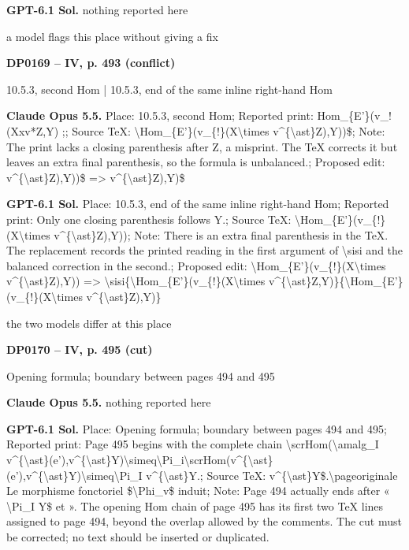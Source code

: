 \textbf{GPT-6.1 Sol.} nothing reported here\par
a model flags this place without giving a fix\par
\par\noindent\hypertarget{DP0169}{}\textbf{DP0169 -- IV, p. 493 (conflict)}\par
10.5.3, second Hom | 10.5.3, end of the same inline right-hand Hom\par
\textbf{Claude Opus 5.5.} Place: 10.5.3, second Hom; Reported print: Hom\_\{E'\}(v\_!(Xxv*Z,Y) ;; Source TeX: \textbackslash{}Hom\_\{E'\}(v\_\{!\}(X\textbackslash{}times v\textasciicircum{}\{\textbackslash{}ast\}Z),Y))\$; Note: The print lacks a closing parenthesis after Z, a misprint. The TeX corrects it but leaves an extra final parenthesis, so the formula is unbalanced.; Proposed edit: v\textasciicircum{}\{\textbackslash{}ast\}Z),Y))\$ =\allowbreak > v\textasciicircum{}\{\textbackslash{}ast\}Z),Y)\$\par
\textbf{GPT-6.1 Sol.} Place: 10.5.3, end of the same inline right-hand Hom; Reported print: Only one closing parenthesis follows Y.; Source TeX: \textbackslash{}Hom\_\{E'\}(v\_\{!\}(X\textbackslash{}times v\textasciicircum{}\{\textbackslash{}ast\}Z),Y)); Note: There is an extra final parenthesis in the TeX. The replacement records the printed reading in the first argument of \textbackslash{}sisi and the balanced correction in the second.; Proposed edit: \textbackslash{}Hom\_\{E'\}(v\_\{!\}(X\textbackslash{}times v\textasciicircum{}\{\textbackslash{}ast\}Z),Y)) =\allowbreak > \textbackslash{}sisi\{\textbackslash{}Hom\_\{E'\}(v\_\{!\}(X\textbackslash{}times v\textasciicircum{}\{\textbackslash{}ast\}Z,Y)\}\{\textbackslash{}Hom\_\{E'\}(v\_\{!\}(X\textbackslash{}times v\textasciicircum{}\{\textbackslash{}ast\}Z),Y)\}\par
the two models differ at this place\par
\par\noindent\hypertarget{DP0170}{}\textbf{DP0170 -- IV, p. 495 (cut)}\par
Opening formula; boundary between pages 494 and 495\par
\textbf{Claude Opus 5.5.} nothing reported here\par
\textbf{GPT-6.1 Sol.} Place: Opening formula; boundary between pages 494 and 495; Reported print: Page 495 begins with the complete chain \textbackslash{}scrHom(\textbackslash{}amalg\_I v\textasciicircum{}\{\textbackslash{}ast\}(e'),v\textasciicircum{}\{\textbackslash{}ast\}Y)\textbackslash{}simeq\textbackslash{}Pi\_i\textbackslash{}scrHom(v\textasciicircum{}\{\textbackslash{}ast\}(e'),v\textasciicircum{}\{\textbackslash{}ast\}Y)\textbackslash{}simeq\textbackslash{}Pi\_I v\textasciicircum{}\{\textbackslash{}ast\}Y.; Source TeX: v\textasciicircum{}\{\textbackslash{}ast\}Y\$.\textbackslash{}pageoriginale Le morphisme fonctoriel \$\textbackslash{}Phi\_v\$ induit; Note: Page 494 actually ends after « \textbackslash{}Pi\_I Y\$ et ». The opening Hom chain of page 495 has its first two TeX lines assigned to page 494, beyond the overlap allowed by the comments. The cut must be corrected; no text should be inserted or duplicated.\par
